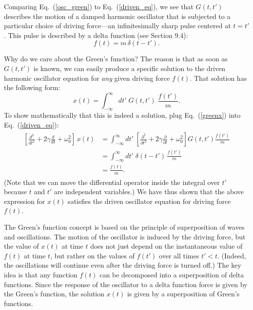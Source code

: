 \documentclass[10pt,a4paper]{article}
\begin{document}
Comparing Eq.~(\ref{osc_green}) to Eq.~(\ref{driven_eq}), we see that
$G(t,t')$ describes the motion of a damped harmonic oscillator that is
subjected to a particular choice of driving force---an infinitesimally
sharp pulse centered at $t = t'$. This pulse is described by a delta
function (see Section 9.4):
\begin{equation}
  f(t) = m\,\delta(t-t').
\end{equation}

Why do we care about the Green's function? The reason is that as soon
as $G(t,t')$ is known, we can easily produce a specific solution to
the driven harmonic oscillator equation for \emph{any} given driving
force $f(t)$. That solution has the following form:
\begin{equation}
  x(t) = \int^\infty_{-\infty} dt' \; G(t,t') \; \frac{f(t')}{m}.
  \label{greenx}
\end{equation}
To show mathematically that this is indeed a solution, plug
Eq.~(\ref{greenx}) into Eq.~(\ref{driven_eq}):
\begin{align}
  \begin{aligned}
    \left[\frac{d^2}{dt^2} + 2 \gamma \frac{d}{dt} + \omega_0^2\right]\, x(t)
    &= \int^\infty_{-\infty} dt' \; \left[\frac{\partial^2}{\partial t^2}
      + 2 \gamma \frac{\partial}{\partial t} + \omega_0^2\right] G(t,t')
    \frac{f(t')}{m} \\ &= \int^\infty_{-\infty} dt' \; \delta(t-t')\,
    \frac{f(t')}{m} \\ &= \frac{f(t)}{m}.
  \end{aligned}
\end{align}
(Note that we can move the differential operator inside the integral
over $t'$ because $t$ and $t'$ are independent variables.) We have
thus shown that the above expression for $x(t)$ satisfies the driven
oscillator equation for driving force $f(t)$.

The Green's function concept is based on the principle of
superposition of waves and oscillations. The motion of the oscillator
is induced by the driving force, but the value of $x(t)$ at time $t$
does not just depend on the instantaneous value of $f(t)$ at time $t$,
but rather on the values of $f(t')$ over all times $t' < t$. (Indeed,
the oscillations will continue even after the driving force is turned
off.)  The key idea is that any function $f(t)$ can be decomposed into
a superposition of delta functions. Since the response of the
oscillator to a delta function force is given by the Green's function,
the solution $x(t)$ is given by a superposition of Green's functions.
\end{document}
